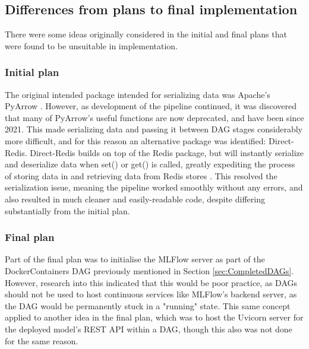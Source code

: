 \documentclass[12pt]{report}
\begin{document}
\subsection{Differences from plans to final implementation}
There were some ideas originally considered in the initial and final plans that were found to be unsuitable in implementation.

\subsubsection{Initial plan}
The original intended package intended for serializing data was Apache's
PyArrow \autocite{apache_streaming_nodate}. However, as development of the pipeline continued, it was discovered that many of PyArrow's
useful functions are now deprecated, and have been since 2021. This made serializing data
and passing it between DAG stages considerably more difficult, and for this reason an alternative
package was identified: Direct-Redis. Direct-Redis builds on top of the Redis package,
but will instantly serialize and deserialize data when set() or get() is called, greatly expediting
the process of storing data in and retrieving data from Redis stores \autocite{direct-redis_direct-redis_nodate}. 
This resolved the serialization issue, meaning the pipeline worked smoothly without
any errors, and also resulted in much cleaner and easily-readable code, despite differing 
substantially from the initial plan.

\subsubsection{Final plan}
Part of the final plan was to initialise the MLFlow server as part of the DockerContainers DAG previously 
mentioned in Section \ref{sec:CompletedDAGs}. However, research into this indicated that this would be poor 
practice, as DAGs should not be used to host continuous services \autocite{apache_architecture_nodate} like MLFlow's 
backend server, as the DAG would be permanently stuck in a "running" state. This same concept applied to another 
idea in the final plan, which was to host the Uvicorn server for the deployed model's REST API within a DAG, 
though this also was not done for the same reason.
\end{document}
